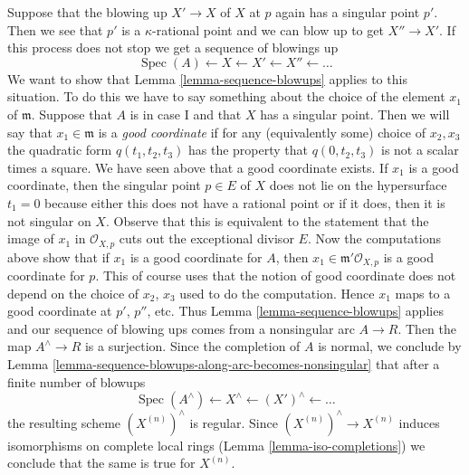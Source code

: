 \documentclass{stacks-project}
\theoremstyle{plain}
\theoremstyle{definition}
\theoremstyle{remark}
\numberwithin{equation}{subsection}
\def\Spec{\mathop{\mathrm{Spec}}}
\begin{document}
\medskip\noindent
Suppose that the blowing up $X' \to X$ of $X$ at $p$ again has a
singular point $p'$. Then we see that $p'$ is a $\kappa$-rational
point and we can blow up to get $X'' \to X'$. If this process
does not stop we get a sequence of blowings up
$$
\Spec(A) \leftarrow X \leftarrow X' \leftarrow X'' \leftarrow \ldots
$$
We want to show that
Lemma \ref{lemma-sequence-blowups}
applies to this situation. To do this we have to say something
about the choice of the element $x_1$ of $\mathfrak m$.
Suppose that $A$ is in case I and that $X$ has a singular point.
Then we will say that $x_1 \in \mathfrak m$ is a {\it good coordinate}
if for any (equivalently some) choice of $x_2, x_3$ the quadratic
form $q(t_1, t_2, t_3)$ has the property that $q(0, t_2, t_3)$
is not a scalar times a square. We have seen above that a good
coordinate exists. If $x_1$ is a good coordinate, then the
singular point $p \in E$ of $X$ does not lie on the hypersurface
$t_1 = 0$ because either this does not have a rational point or
if it does, then it is not singular on $X$. Observe that this
is equivalent to the
statement that the image of $x_1$ in $\mathcal{O}_{X, p}$ cuts
out the exceptional divisor $E$. Now the computations above show
that if $x_1$ is a good coordinate for $A$, then
$x_1 \in \mathfrak m'\mathcal{O}_{X, p}$ is a good coordinate
for $p$. This of course uses that the notion of good coordinate
does not depend on the choice of $x_2$, $x_3$ used to do the
computation. Hence $x_1$ maps to a good coordinate at
$p'$, $p''$, etc. Thus
Lemma \ref{lemma-sequence-blowups}
applies and our sequence of blowing
ups comes from a nonsingular arc $A \to R$.
Then the map $A^\wedge \to R$ is a surjection.
Since the completion of $A$ is normal, we conclude by
Lemma \ref{lemma-sequence-blowups-along-arc-becomes-nonsingular}
that after a finite number of blowups
$$
\Spec(A^\wedge) \leftarrow X^\wedge \leftarrow (X')^\wedge \leftarrow \ldots
$$
the resulting scheme $(X^{(n)})^\wedge$ is regular. Since
$(X^{(n)})^\wedge \to X^{(n)}$ induces isomorphisms on complete
local rings (Lemma \ref{lemma-iso-completions}) we conclude
that the same is true for $X^{(n)}$.
\end{document}
